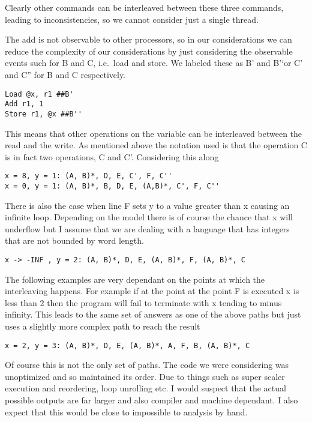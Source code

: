\documentclass[11pt,a4paper]{article}
\begin{document}
Clearly other commands can be interleaved between these three commands,
leading to inconsistencies, so we cannot consider just a single thread.

The add is not observable to other processors, so in our considerations
we can reduce the complexity of our considerations by just considering
the observable events such for B and C, i.e.~load and store. We labeled
these as B' and B'`or C' and C'' for B and C respectively.

\begin{verbatim}
Load @x, r1 ##B'
Add r1, 1
Store r1, @x ##B''
\end{verbatim}

This means that other operations on the variable can be interleaved
between the read and the write. As mentioned above the notation used is
that the operation C is in fact two operations, C and C'. Considering
this along

\begin{verbatim}
x = 8, y = 1: (A, B)*, D, E, C', F, C''
x = 0, y = 1: (A, B)*, B, D, E, (A,B)*, C', F, C''
\end{verbatim}

There is also the case when line F sets y to a value greater than x
causing an infinite loop. Depending on the model there is of course the
chance that x will underflow but I assume that we are dealing with a
language that has integers that are not bounded by word length.

\begin{verbatim}
x -> -INF , y = 2: (A, B)*, D, E, (A, B)*, F, (A, B)*, C
\end{verbatim}

The following examples are very dependant on the points at which the
interleaving happens. For example if at the point at the point F is
executed x is less than 2 then the program will fail to terminate with x
tending to minus infinity. This leads to the same set of answers as one
of the above paths but just uses a slightly more complex path to reach
the result

\begin{verbatim}
x = 2, y = 3: (A, B)*, D, E, (A, B)*, A, F, B, (A, B)*, C 
\end{verbatim}

Of course this is not the only set of paths. The code we were
considering was unoptimized and so maintained its order. Due to things
such as super scaler execution and reordering, loop unrolling etc. I
would suspect that the actual possible outputs are far larger and also
compiler and machine dependant. I also expect that this would be close
to impossible to analysis by hand.
\end{document}

